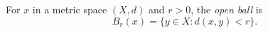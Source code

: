 
For $x$ in a metric space $(X,d)$ and $r>0$, the \emph{open ball} is
\[
B_r(x)=\{y\in X:d(x,y)<r\}.
\]
